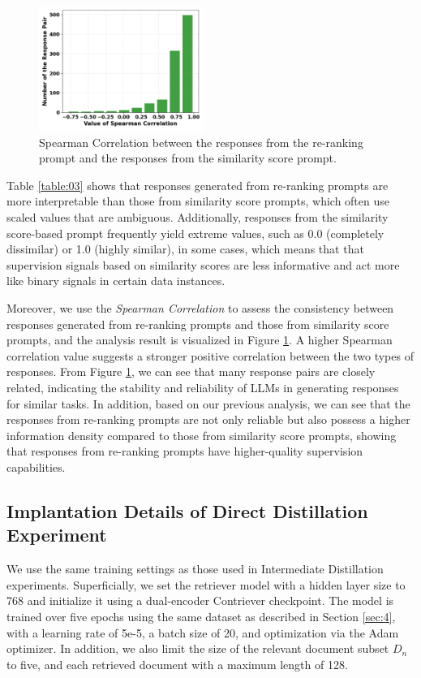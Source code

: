 \begin{figure}[!htbp]
    \centering
    \includegraphics[width=0.48\textwidth]{latex/pic/fig7.pdf}
    \caption{Spearman Correlation between the responses from the re-ranking prompt and the responses from the similarity score prompt.}
    \label{fig:07}
    \vspace{-4mm}
\end{figure}

Table \ref{table:03} shows that responses generated from re-ranking prompts are more interpretable than those from similarity score prompts, which often use scaled values that are ambiguous.
Additionally, responses from the similarity score-based prompt frequently yield extreme values, such as 0.0 (completely dissimilar) or 1.0 (highly similar), in some cases, which means that  that supervision signals based on similarity scores are less informative and act more like binary signals in certain data instances.

Moreover, we use the \textit{Spearman Correlation} to assess the consistency between responses generated from re-ranking prompts and those from similarity score prompts, and the analysis result is visualized in Figure \ref{fig:07}.
A higher Spearman correlation value suggests a stronger positive correlation between the two types of responses.
From Figure \ref{fig:07}, we can see that many response pairs are closely related, indicating the stability and reliability of LLMs in generating responses for similar tasks.
In addition, based on our previous analysis, we can see that the responses from re-ranking prompts are not only reliable but also possess a higher information density compared to those from similarity score prompts, showing that responses from re-ranking prompts have higher-quality supervision capabilities.

\subsection{Implantation Details of Direct Distillation Experiment}
We use the same training settings as those used in Intermediate Distillation experiments.
Superficially, we set the retriever model with a hidden layer size to 768 and initialize it using a dual-encoder Contriever checkpoint.
The model is trained over five epochs using the same dataset as described in Section \ref{sec:4}, with a learning rate of 5e-5, a batch size of 20, and optimization via the Adam optimizer.
In addition, we also limit the size of the relevant document subset $D_n$ to five, and each retrieved document with a maximum length of 128.


